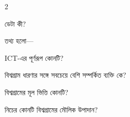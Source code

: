 \begin{topicbody}
\begin{multicols}{2}\begin{compactenum}
\item \begin{minipage}[t]{\linewidth}ডেটা কী?\par {}\par\end{minipage}

\item \begin{minipage}[t]{\linewidth}তথ্য হলো—\par {}\par\end{minipage}

\item \begin{minipage}[t]{\linewidth}ICT-এর পূর্ণরূপ কোনটি?\par {}\par\end{minipage}

\item \begin{minipage}[t]{\linewidth}বিশ্বগ্রাম ধারণার সঙ্গে সবচেয়ে বেশি সম্পর্কিত ব্যক্তি কে?\par {}\par\end{minipage}

\item \begin{minipage}[t]{\linewidth}বিশ্বগ্রামের মূল ভিত্তি কোনটি?\par {}\par\end{minipage}

\item \begin{minipage}[t]{\linewidth}নিচের কোনটি বিশ্বগ্রামের মৌলিক উপাদান?\par {}\par\end{minipage}


\end{compactenum}
\end{multicols}
\end{topicbody}
